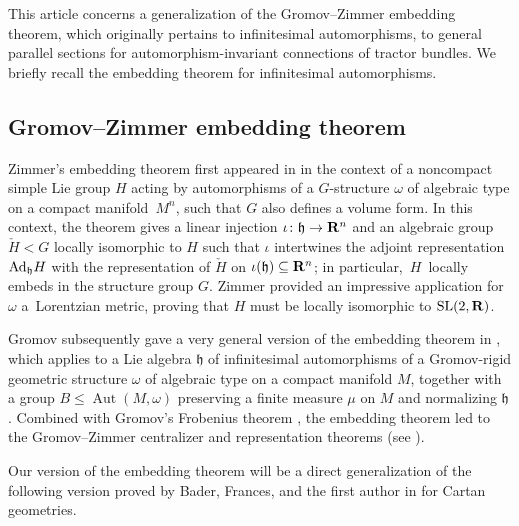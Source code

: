\documentclass[10pt,a4paper]{amsart}
\numberwithin{equation}{section}
\theoremstyle{definition}
\newcommand{\BR}{{\bf R}}
\newcommand{\lieh}{\mathfrak{h}}
\newcommand{\Aut}{\operatorname{Aut}}
\begin{document}
This article concerns a
generalization of the Gromov--Zimmer embedding theorem, which originally pertains to
infinitesimal automorphisms, to general parallel sections for automorphism-invariant connections of tractor bundles.
We briefly recall the embedding theorem for infinitesimal automorphisms.

\subsection{Gromov--Zimmer embedding theorem}
\label{sec.intro.embedding}

Zimmer's embedding theorem first appeared in \cite{zimmer.lorentz} in the context of a noncompact simple Lie group $H$ acting by automorphisms of a $G$-structure $\omega$ of algebraic type on a compact manifold~$M^n$, such that $G$ also defines a volume form. In this context, the theorem gives a linear injection $\iota\colon \lieh \rightarrow \BR^n$ and an algebraic group $\check{H} < G$ locally isomorphic to $H$ such that $\iota$ intertwines the adjoint representation ${\rm Ad}_\lieh H$ with the representation of $\check{H}$ on $\iota(\lieh) \subseteq \BR^n$; in particular,~$H$~locally embeds in the structure group $G$. Zimmer provided an impressive application for~$\omega$ a~Lorentzian metric, proving that $H$ must be locally isomorphic to ${\rm SL}(2,\BR)$.

Gromov subsequently gave a very general version of the embedding theorem in \cite[Theorem~5.2.A]{gromov.rgs}, which applies to a Lie algebra $\lieh$ of infinitesimal automorphisms of a Gromov-rigid geometric structure $\omega$ of algebraic type on a compact manifold $M$, together with a group $B \leq \Aut(M,\omega)$ preserving a finite measure $\mu$ on $M$ and normalizing $\lieh$. Combined with Gromov's Frobenius theorem \cite[Theorem~1.3.A]{gromov.rgs}, the embedding theorem led to the Gromov--Zimmer centralizer and representation theorems (see \cite{zimmer.gromovrep}).

Our version of the embedding theorem will be a direct generalization of the following version proved by Bader, Frances, and the first author in \cite[Theorems~1.2 and 4.1]{bfm.zimemb} for Cartan geometries.
\end{document}
